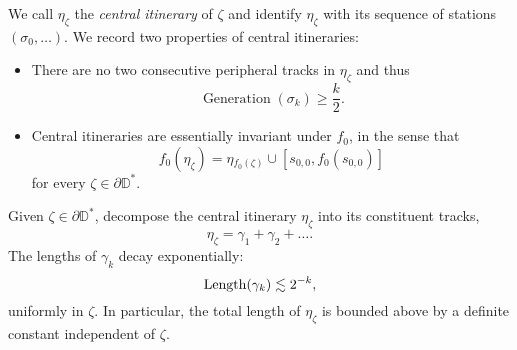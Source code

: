 

We call $\eta_{\zeta}$ the \emph{central itinerary} of $\zeta$ and identify $\eta_{\zeta}$ with its sequence of stations $(\sigma_0,\ldots)$. We record two properties of central itineraries:

\begin{itemize}
	\item There are no two consecutive peripheral tracks in $\eta_{\zeta}$ and thus
	\begin{equation} \label{generation-lower-bound}
		\operatorname{Generation}(\sigma_k)\geq \frac k2.
	\end{equation}
	
	\item Central itineraries are essentially invariant under $f_{0}$, in the sense that
	\begin{equation*}
		f_{0}(\eta_{\zeta})=\eta{}_{f_{0}(\zeta)}\cup[s_{0,0},f_0(s_{0,0})]
	\end{equation*}
	for every $\zeta\in \partial \mathbb D^*$.
\end{itemize}

\begin{lemma} \label{track_decay}
Given $\zeta\in \partial \mathbb D^*$, decompose the central itinerary $\eta_{\zeta}$ into its constituent tracks, 
$$\eta_{\zeta}=\gamma _1 + \gamma_2 + \dots.$$ 
	The lengths of $\gamma_k$ decay exponentially:
	$$\operatorname{Length}(\gamma_{k})\lesssim 2^{-k},$$ uniformly in $\zeta$. 
In particular, the total length of $\eta_\zeta$ is bounded above by a definite constant independent of $\zeta$.
\end{lemma}





